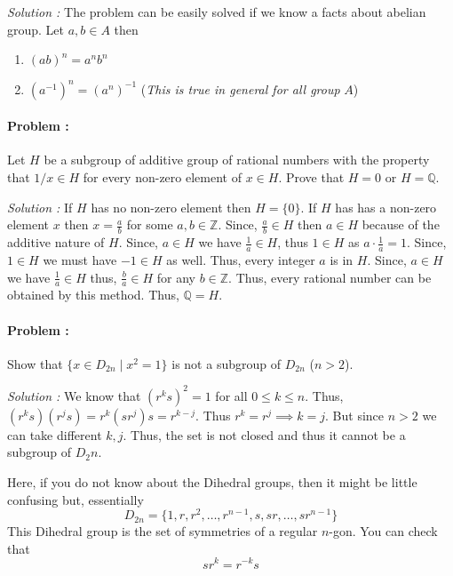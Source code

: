\vspace{4mm}
\textit{Solution :} The problem can be easily solved if we know a facts about abelian group. Let $a,b \in A$ then
\begin{enumerate}
    \item $(ab)^n= a^n b^n$
    \item $(a^{-1})^n=(a^n)^{-1}$ \quad (\textit{This is true in general for all group }$A$)
\end{enumerate}

\paragraph{Problem :} Let $H$ be a subgroup of additive group of rational numbers with the property that $1/x \in H$ for every non-zero element of $x \in H$.
Prove that $H=0$ or $H=\mathbb{Q}$.

\vspace{4mm}
\textit{Solution :} If $H$ has no non-zero element then $H=\{0\}$. If $H$ has has a non-zero element $x$ then $x=\frac{a}{b}$ for some $a,b \in \mathbb{Z}$.
Since, $\frac{a}{b} \in H$ then $a \in H$ because of the additive nature of $H$. Since, $a \in H$ we have $\frac{1}{a} \in H$, thus $1 \in H$ as 
$a \cdot \frac{1}{a} = 1$. Since, $1 \in H$ we must have $-1 \in H$ as well. Thus, every integer $a$ is in $H$. Since, $a \in H$ we have $\frac{1}{a} \in H$
thus, $\frac{b}{a} \in H$ for any $b \in \mathbb{Z}$. Thus, every rational number can be obtained by this method. Thus, $\mathbb{Q}=H$.

\paragraph{Problem :} Show that $\{x \in D_{2n} \mid x^2 = 1\}$ is not a subgroup of $D_{2n}$ ($n>2$).


\vspace{4mm}
\textit{Solution :} We know that $(r^k s)^2=1$ for all $0 \le k \le n$. Thus, $(r^{k}s)(r^{j}s)= r^k (s r^j) s = r^{k-j}$. Thus $r^k=r^j \implies k=j$. But
since $n > 2$ we can take different $k,j$. Thus, the set is not closed and thus it cannot be a subgroup of $D_2n$.

\begin{remark}
    Here, if you do not know about the Dihedral groups, then it might be little confusing but, essentially 
    \[ D_{2n} = \{1,r,r^2,\ldots,r^{n-1},s,sr,\ldots,sr^{n-1} \} \] 
    This Dihedral group is the set of symmetries of a regular $n$-gon. You can check that
    \[ sr^k = r^{-k}s  \]
\end{remark}